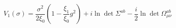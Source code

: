 \begin{equation}
V_{1}(\sigma )=\frac{\sigma ^{2}}{2\xi _{0}}\left( 1-\frac{\xi _{1}}{\xi _{0}%
}g^{2}\right) +i\ln \det \Sigma ^{ab}-\frac{i}{2}\ln \det \Omega _{\mu \nu
}^{ab}  \label{v}
\end{equation}

